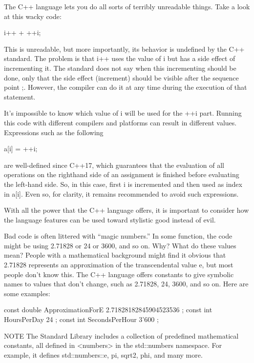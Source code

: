
The C++ language lets you do all sorts of terribly unreadable things. Take a look at this wacky code:

\begin{cpp}
i++ + ++i;
\end{cpp}

This is unreadable, but more importantly, its behavior is undefined by the C++ standard. The problem is that i++ uses the value of i but has a side effect of incrementing it. The standard does not say when this incrementing should be done, only that the side effect (increment) should be visible after the sequence point ;. However, the compiler can do it at any time during the execution of that statement.

It’s impossible to know which value of i will be used for the ++i part. Running this code with different compilers and platforms can result in different values.
Expressions such as the following

\begin{cpp}
a[i] = ++i;
\end{cpp}

are well-defined since C++17, which guarantees that the evaluation of all operations on the righthand side of an assignment is finished before evaluating the left-hand side. So, in this case, first i is incremented and then used as index in a[i]. Even so, for clarity, it remains recommended to avoid such expressions.

With all the power that the C++ language offers, it is important to consider how the language features can be used toward stylistic good instead of evil.


Bad code is often littered with “magic numbers.” In some function, the code might be using 2.71828 or 24 or 3600, and so on. Why? What do these values mean? People with a mathematical background might find it obvious that 2.71828 represents an approximation of the transcendental value e, but most people don’t know this. The C++ language offers constants to give symbolic names to values that don’t change, such as 2.71828, 24, 3600, and so on. Here are some examples:

\begin{cpp}
const double ApproximationForE { 2.71828182845904523536 };
const int HoursPerDay { 24 };
const int SecondsPerHour { 3'600 };
\end{cpp}

\begin{myNotic}{NOTE}
The Standard Library includes a collection of predefined mathematical constants, all defined in <numbers> in the std::numbers namespace. For example, it defines std::numbers::e, pi, sqrt2, phi, and many more.
\end{myNotic}


